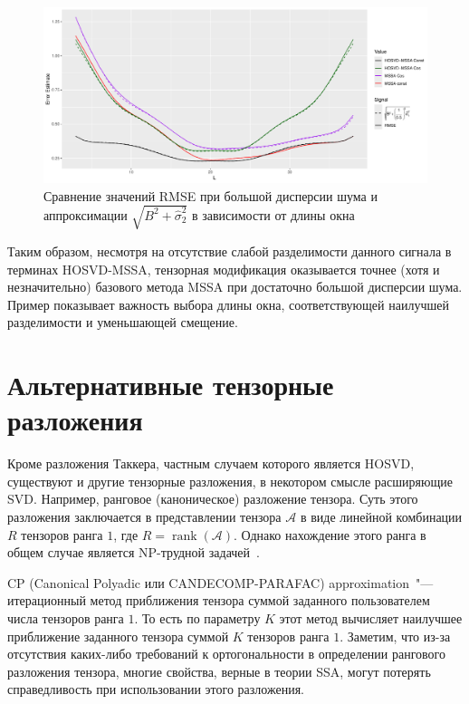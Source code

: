 \documentclass[specialist,
    substylefile = spbu.rtx,
    subf,href,colorlinks=true, 12pt]{disser}
\theoremstyle{plain}
\theoremstyle{definition}
\theoremstyle{remark}
\begin{document}
    \begin{figure}[!h]
        \centering
        \includegraphics[width=\textwidth]{approx_sep_errors}
        \caption{Сравнение значений RMSE при большой дисперсии шума и аппроксимации $\sqrt{B^2 + \hat{\sigma}_2^2}$ в зависимости от длины окна}
        \label{fig:approx-sep-errors}
    \end{figure}
    
    Таким образом, несмотря на отсутствие слабой разделимости данного сигнала в терминах HOSVD-MSSA,
    тензорная модификация оказывается точнее (хотя и незначительно) базового метода MSSA при достаточно большой дисперсии шума. Пример показывает важность выбора длины окна, соответствующей наилучшей разделимости и уменьшающей смещение.

    \section{Альтернативные тензорные разложения}\label{sec:other-decomp}
    Кроме разложения Таккера, частным случаем которого является HOSVD, существуют и другие тензорные разложения,
    в некотором смысле расширяющие SVD.
    Например, ранговое (каноническое) разложение тензора.
    Суть этого разложения заключается в представлении тензора $\mathcal{A}$ в виде линейной комбинации $R$ тензоров
    ранга $1$, где $R=\operatorname{rank}(\mathcal{A})$.
    Однако нахождение этого ранга в общем случае является NP-трудной задачей~\cite{NP-hard}.

    CP (Canonical Polyadic или CANDECOMP-PARAFAC) approximation~\cite{parafac1, parafac2}"--- итерационный метод
    приближения тензора суммой заданного пользователем числа тензоров ранга $1$.
    То есть по параметру $K$ этот метод вычисляет наилучшее приближение заданного тензора суммой $K$ тензоров ранга $1$.
    Заметим, что из-за отсутствия каких-либо требований к ортогональности в определении рангового разложения тензора,
    многие свойства, верные в теории SSA, могут потерять справедливость при использовании этого разложения.
\end{document}
